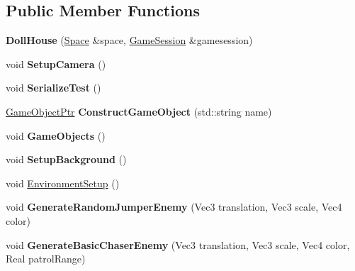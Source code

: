 \subsection*{Public Member Functions}
\begin{DoxyCompactItemize}
\item 
\hypertarget{classDCEngine_1_1DollHouse_a2e74c227d1a107a35c0d2166884f9009}{{\bfseries Doll\-House} (\hyperlink{classDCEngine_1_1Space}{Space} \&space, \hyperlink{classDCEngine_1_1GameSession}{Game\-Session} \&gamesession)}\label{classDCEngine_1_1DollHouse_a2e74c227d1a107a35c0d2166884f9009}

\item 
\hypertarget{classDCEngine_1_1DollHouse_af366b869a9ffe11f143a30d164489a58}{void {\bfseries Setup\-Camera} ()}\label{classDCEngine_1_1DollHouse_af366b869a9ffe11f143a30d164489a58}

\item 
\hypertarget{classDCEngine_1_1DollHouse_a265608cde0beeabeeea3b6c1c7057f3c}{void {\bfseries Serialize\-Test} ()}\label{classDCEngine_1_1DollHouse_a265608cde0beeabeeea3b6c1c7057f3c}

\item 
\hypertarget{classDCEngine_1_1DollHouse_abe570d2358679c6ea4173615b89d222f}{\hyperlink{classDCEngine_1_1GameObject}{Game\-Object\-Ptr} {\bfseries Construct\-Game\-Object} (std\-::string name)}\label{classDCEngine_1_1DollHouse_abe570d2358679c6ea4173615b89d222f}

\item 
\hypertarget{classDCEngine_1_1DollHouse_a747a009e50a3b8ba06cb008b825020a7}{void {\bfseries Game\-Objects} ()}\label{classDCEngine_1_1DollHouse_a747a009e50a3b8ba06cb008b825020a7}

\item 
\hypertarget{classDCEngine_1_1DollHouse_a446989e020945448a15e3b6bdcc3c4f1}{void {\bfseries Setup\-Background} ()}\label{classDCEngine_1_1DollHouse_a446989e020945448a15e3b6bdcc3c4f1}

\item 
void \hyperlink{classDCEngine_1_1DollHouse_aa95ff0381366798633318e9d25dd17a2}{Environment\-Setup} ()
\item 
\hypertarget{classDCEngine_1_1DollHouse_a1233fd14eeb65b3c07b996ea337c82ea}{void {\bfseries Generate\-Random\-Jumper\-Enemy} (Vec3 translation, Vec3 scale, Vec4 color)}\label{classDCEngine_1_1DollHouse_a1233fd14eeb65b3c07b996ea337c82ea}

\item 
\hypertarget{classDCEngine_1_1DollHouse_a18ad62bc3e68faefe70c40f80d514a8b}{void {\bfseries Generate\-Basic\-Chaser\-Enemy} (Vec3 translation, Vec3 scale, Vec4 color, Real patrol\-Range)}\label{classDCEngine_1_1DollHouse_a18ad62bc3e68faefe70c40f80d514a8b}


\end{DoxyCompactItemize}
